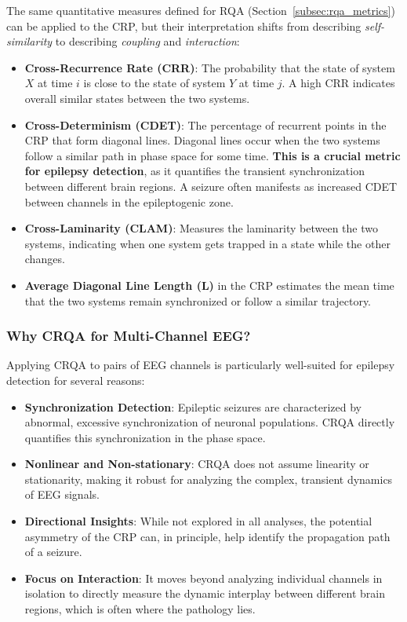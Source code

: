 \documentclass{article}
\begin{document}
					The same quantitative measures defined for RQA (Section~\ref{subsec:rqa_metrics}) can be applied to the CRP, but their interpretation shifts from describing \emph{self-similarity} to describing \emph{coupling} and \emph{interaction}:

					\begin{itemize}
					    \item \textbf{Cross-Recurrence Rate (CRR)}: The probability that the state of system \( X \) at time \( i \) is close to the state of system \( Y \) at time \( j \). A high CRR indicates overall similar states between the two systems.
					    
					    \item \textbf{Cross-Determinism (CDET)}: The percentage of recurrent points in the CRP that form diagonal lines. Diagonal lines occur when the two systems follow a similar path in phase space for some time. \textbf{This is a crucial metric for epilepsy detection}, as it quantifies the transient synchronization between different brain regions. A seizure often manifests as increased CDET between channels in the epileptogenic zone.
					    
					    \item \textbf{Cross-Laminarity (CLAM)}: Measures the laminarity between the two systems, indicating when one system gets trapped in a state while the other changes.
					    
					    \item \textbf{Average Diagonal Line Length (L)} in the CRP estimates the mean time that the two systems remain synchronized or follow a similar trajectory.
					\end{itemize}

					\subsubsection{Why CRQA for Multi-Channel EEG?}

					Applying CRQA to pairs of EEG channels is particularly well-suited for epilepsy detection for several reasons:

					\begin{itemize}
					    \item \textbf{Synchronization Detection}: Epileptic seizures are characterized by abnormal, excessive synchronization of neuronal populations. CRQA directly quantifies this synchronization in the phase space.
					    \item \textbf{Nonlinear and Non-stationary}: CRQA does not assume linearity or stationarity, making it robust for analyzing the complex, transient dynamics of EEG signals.
					    \item \textbf{Directional Insights}: While not explored in all analyses, the potential asymmetry of the CRP can, in principle, help identify the propagation path of a seizure.
					    \item \textbf{Focus on Interaction}: It moves beyond analyzing individual channels in isolation to directly measure the dynamic interplay between different brain regions, which is often where the pathology lies.
					\end{itemize}
\end{document}
